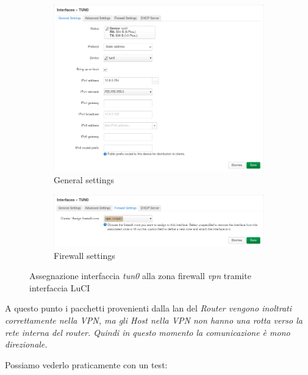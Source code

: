 \begin{figure}[H]
    \centering
    \begin{subfigure}{1\linewidth}
        \centering
        \includegraphics[width=1\linewidth]{immagini/LuCI_int_tun0_1}
        \caption{General settings}
        \label{fig:luci-firewall-interfaces}
    \end{subfigure}
    \medskip
    \begin{subfigure}{1\linewidth}
        \centering
        \includegraphics[width=1\linewidth]{immagini/LuCI_int_tun0_2}
        \caption{Firewall settings}
        \label{fig:luci-firewall-interfaces1}
    \end{subfigure}
    \caption{Assegnazione interfaccia \textit{tun0} alla zona firewall \textit{vpn} tramite interfaccia LuCI}
\end{figure}

A questo punto i pacchetti provenienti dalla lan del \it{Router} vengono inoltrati correttamente nella VPN, ma gli Host nella VPN non hanno una rotta verso la rete interna del router. Quindi in questo momento la comunicazione è mono direzionale.

Possiamo vederlo praticamente con un test:

